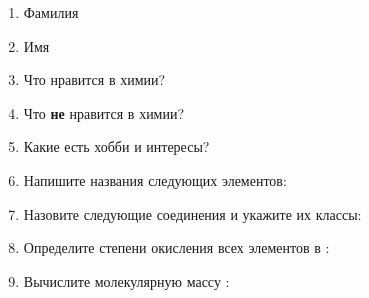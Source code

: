 \documentclass[12pt, a4paper, oneside]{article}	%
\begin{document}
\begin{enumerate}[1.] %
	\item
		Фамилия

		\hrulefill

	\item
		Имя

		\hrulefill

	\item
		Что нравится в химии?

		\hrulefill

		\hrulefill

	\item
		Что \textbf{не} нравится в химии?

		\hrulefill

		\hrulefill

	\item
		Какие есть хобби и интересы?

		\hrulefill

		\hrulefill

	\item
		Напишите названия следующих элементов:


		\hrulefill

		\hrulefill

	\item
		Назовите следующие соединения и укажите их классы:


		\hrulefill

		\hrulefill
	
		\hrulefill

	\item
		Определите степени окисления всех элементов в :

		\hrulefill

		\hrulefill
		
	\item
		Вычислите молекулярную массу :

		\hrulefill

		\hrulefill

\end{enumerate}
\end{document}
